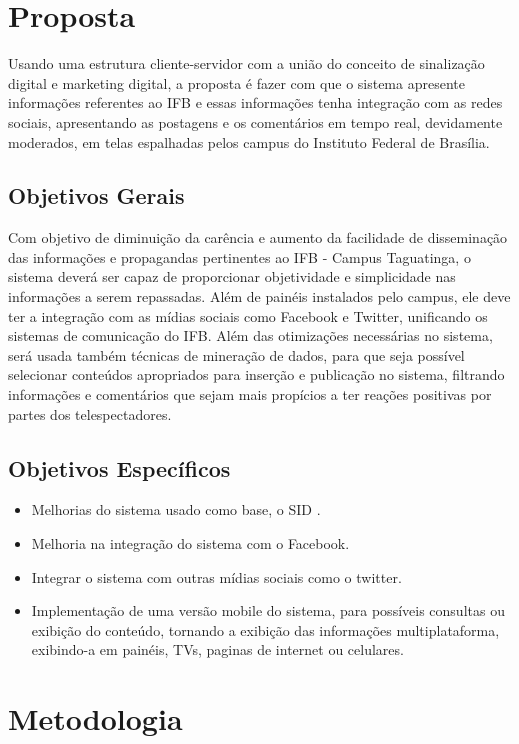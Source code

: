 \documentclass[
	12pt,				%
	openright,			%
	oneside,			%
	a4paper,			%
	english,			%
	french,				%
	spanish,			%
	brazil,				%
	]{abntex2}
\begin{document}
\section*{Proposta}
	Usando uma estrutura cliente-servidor com a união do conceito de sinalização digital e marketing digital, a proposta é fazer com que o sistema apresente informações referentes ao IFB e essas informações tenha integração com as redes sociais, apresentando as postagens e os comentários em tempo real, devidamente moderados, em telas espalhadas pelos campus do Instituto Federal de Brasília.
	
\subsection*{Objetivos Gerais}
	Com objetivo de diminuição da carência e aumento da facilidade de disseminação das informações e propagandas pertinentes ao IFB - Campus Taguatinga, o sistema deverá ser capaz de proporcionar objetividade e simplicidade nas informações a serem repassadas. Além de painéis instalados pelo campus, ele deve ter a integração com as mídias sociais como Facebook e Twitter, unificando os sistemas de comunicação do IFB. Além das otimizações necessárias no sistema, será usada também técnicas de mineração de dados, para que seja possível selecionar conteúdos apropriados para inserção e publicação no sistema, filtrando informações e comentários que sejam mais propícios a ter reações positivas por partes dos telespectadores.


\subsection*{Objetivos Específicos}
	 \begin{itemize}
	\item Melhorias do sistema usado como base, o SID \cite{sobrinho2017}.
	
	\item Melhoria na integração do sistema com o Facebook.
	
	\item Integrar o sistema com outras mídias sociais como o twitter.
	
	\item Implementação de uma versão mobile do sistema, para possíveis consultas ou exibição do conteúdo, tornando a exibição das informações multiplataforma, exibindo-a em painéis, TVs, paginas de internet ou celulares.
	\end{itemize}
\section*{Metodologia}
\end{document}
